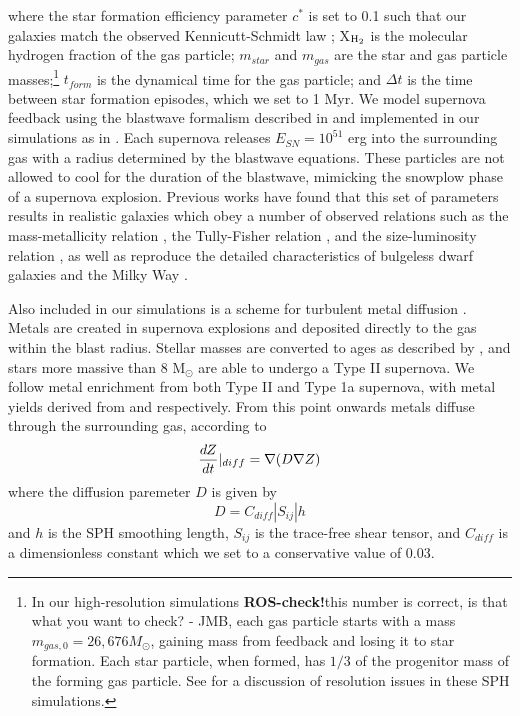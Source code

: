 \documentclass[nofootinbib,twocolumn,prd]{emulateapj}
\newcommand\jillianremark[1]{{\color{blue}#1}}
\begin{document}
\noindent
where the star formation efficiency parameter $c^*$ is set to 0.1 such
that our galaxies match the observed Kennicutt-Schmidt law
\citep{1989ApJ...344..685K};  X$_{\rm H_2}$ is the molecular hydrogen fraction of the gas particle; $m_{star}$ and $m_{gas}$ are the star and gas
particle masses;\footnote{In our high-resolution simulations \textbf{ROS-check!}\jillianremark{this number is correct, is that what you want to check? - JMB}, each gas particle starts with a mass
  $m_{gas,0}=26,676 M_\odot$, gaining mass from feedback and losing it to star formation.  Each star particle, when
  formed, has $1/3$ of the progenitor mass of the forming gas particle.  See \cite{2010ApJ...717..121C} for a discussion
of resolution issues in these SPH simulations.} $t_{form}$ is the dynamical time for the gas
particle; and $\Delta t$ is the time between star formation episodes,
which we set to 1 Myr.  We model supernova feedback using the
blastwave formalism described in \citet{1977ApJ...218..148M} and implemented in
our simulations as in \citet{2006MNRAS.373.1074S}.  Each supernova releases
$E_{SN} = 10^{51}$ erg into the surrounding gas with a radius
determined by the blastwave equations.  These particles are not
allowed to cool for the duration of the blastwave, mimicking the
snowplow phase of a supernova explosion.  Previous works have found
that this set of parameters results in realistic galaxies which obey a
number of observed relations such as the mass-metallicity relation
\citep{2007ApJ...655L..17B}, the Tully-Fisher relation \citep{2009MNRAS.398..312G}, and
the size-luminosity relation \citep{2011ApJ...728...51B}, as well as reproduce
the detailed characteristics of bulgeless dwarf galaxies
\citep{2010Natur.463..203G} and the Milky Way \citep{2011ApJ...742...76G}.


Also included in our simulations is a scheme for turbulent metal
diffusion \citep{2010MNRAS.407.1581S}.  Metals are created in supernova explosions
and deposited directly to the gas within the blast radius.  Stellar
masses are converted to ages as described by \citet{1996A&A...315..105R}, and
stars more massive than 8 M$_\odot$ are able to undergo a Type II
supernova.  We follow metal enrichment from both Type II and Type 1a
supernova, with metal yields derived from \citet{1993PhR...227...65W} and
\citet{1986A&A...158...17T} respectively.  From this point onwards metals
diffuse through the surrounding gas, according to 
\begin{equation}
\frac{dZ}{dt}|_{diff} = \nabla (D \nabla {Z}) \\
\end{equation}
%
where the diffusion paremeter $D$ is given by
%
\begin{equation}
D = C_{diff} |S_{ij}| h
\end{equation}
%
and $h$ is the SPH smoothing length, $S_{ij}$ is the trace-free shear
tensor, and $C_{diff}$ is a dimensionless constant which we set to a conservative value of 0.03.  
\end{document}
